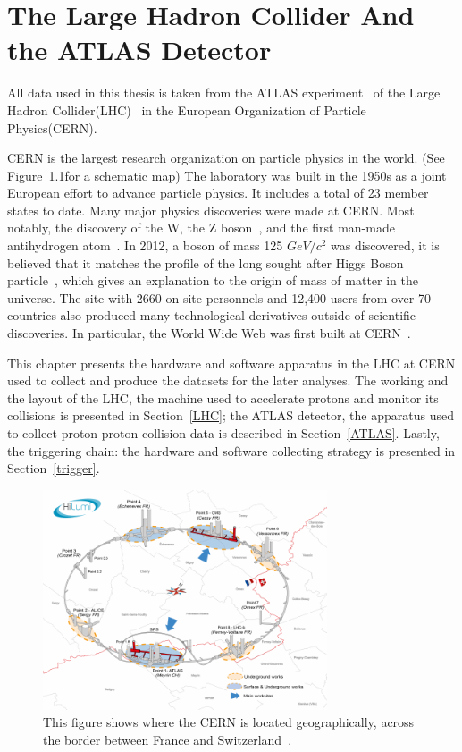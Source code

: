 \chapter{The Large Hadron Collider And the ATLAS Detector}
\label{chapter:ATLAS}

All data used in this thesis is taken from the ATLAS experiment~\cite{ATLAS:1999vwa} of the Large Hadron Collider(LHC)~\cite{Bruning:782076} in the European Organization of Particle Physics(CERN).

CERN is the largest research organization on particle physics in the world. (See Figure~\ref{fig:LHCOnBorder}for a schematic map) The laboratory was built in the 1950s as a joint European effort to advance particle physics. It includes a total of 23 member states to date. Many major physics discoveries were made at CERN. Most notably, the discovery of the W, the Z boson~\cite{hioki1982does}, and the first man-made antihydrogen atom~\cite{hioki1982does}. In 2012, a boson of mass 125 $GeV/c^{2}$ was discovered, it is believed that it matches the
profile of the long sought after Higgs Boson particle~\cite{chatrchyan2012observation}, which gives an explanation to the origin of mass of matter in the universe. The site with 2660 on-site personnels and 12,400 users from over 70 countries also produced many technological derivatives outside of scientific discoveries. In particular, the World Wide Web was first built at CERN~\cite{berners1994world}.

This chapter presents the hardware and software apparatus in the LHC at CERN used to collect and produce the datasets for the later analyses.
The working and the layout of the LHC, the machine used to accelerate protons and monitor its collisions is presented in Section~\ref{LHC}; the ATLAS detector, the apparatus used to collect proton-proton collision data is described in Section~\ref{ATLAS}. Lastly, the triggering chain: the hardware and software collecting strategy is presented in Section~\ref{trigger}.

\begin{figure}[!htb]
    \begin{center}
        \includegraphics[width=0.75\textwidth]{figures/chapter_ATLAS/LHCOnBorder}
        \caption{
            This figure shows where the CERN is located geographically, across the border between France and Switzerland~\cite{Bruning:782076}.
        }
        \label{fig:LHCOnBorder}
    \end{center}
\end{figure}

